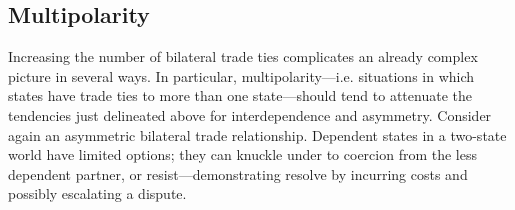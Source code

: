 \documentclass[12pt]{article}
\theoremstyle{hypothesis}
\begin{document}



\subsection*{Multipolarity}

Increasing the number of bilateral trade ties complicates an already complex picture in several ways.  In particular, multipolarity---i.e. situations in which states have trade ties to more than one state---should tend to attenuate the tendencies just delineated above for interdependence and asymmetry.  Consider again an asymmetric bilateral trade relationship.  Dependent states in a two-state world have limited options; they can knuckle under to coercion from the less dependent partner, or resist---demonstrating resolve by incurring costs and possibly escalating a dispute.
\end{document}

